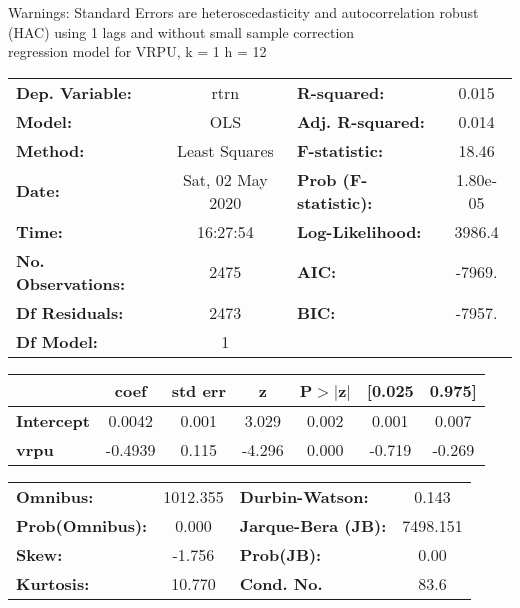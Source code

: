 Warnings: \newline
 [1] Standard Errors are heteroscedasticity and autocorrelation robust (HAC) using 1 lags and without small sample correction\\ 

regression model for VRPU, k = 1 h = 12\begin{center}
\begin{tabular}{lclc}
\toprule
\textbf{Dep. Variable:}    &       rtrn       & \textbf{  R-squared:         } &     0.015   \\
\textbf{Model:}            &       OLS        & \textbf{  Adj. R-squared:    } &     0.014   \\
\textbf{Method:}           &  Least Squares   & \textbf{  F-statistic:       } &     18.46   \\
\textbf{Date:}             & Sat, 02 May 2020 & \textbf{  Prob (F-statistic):} &  1.80e-05   \\
\textbf{Time:}             &     16:27:54     & \textbf{  Log-Likelihood:    } &    3986.4   \\
\textbf{No. Observations:} &        2475      & \textbf{  AIC:               } &    -7969.   \\
\textbf{Df Residuals:}     &        2473      & \textbf{  BIC:               } &    -7957.   \\
\textbf{Df Model:}         &           1      & \textbf{                     } &             \\
\bottomrule
\end{tabular}
\begin{tabular}{lcccccc}
                   & \textbf{coef} & \textbf{std err} & \textbf{z} & \textbf{P$> |$z$|$} & \textbf{[0.025} & \textbf{0.975]}  \\
\midrule
\textbf{Intercept} &       0.0042  &        0.001     &     3.029  &         0.002        &        0.001    &        0.007     \\
\textbf{vrpu}      &      -0.4939  &        0.115     &    -4.296  &         0.000        &       -0.719    &       -0.269     \\
\bottomrule
\end{tabular}
\begin{tabular}{lclc}
\textbf{Omnibus:}       & 1012.355 & \textbf{  Durbin-Watson:     } &    0.143  \\
\textbf{Prob(Omnibus):} &   0.000  & \textbf{  Jarque-Bera (JB):  } & 7498.151  \\
\textbf{Skew:}          &  -1.756  & \textbf{  Prob(JB):          } &     0.00  \\
\textbf{Kurtosis:}      &  10.770  & \textbf{  Cond. No.          } &     83.6  \\
\bottomrule
\end{tabular}
\end{center}


